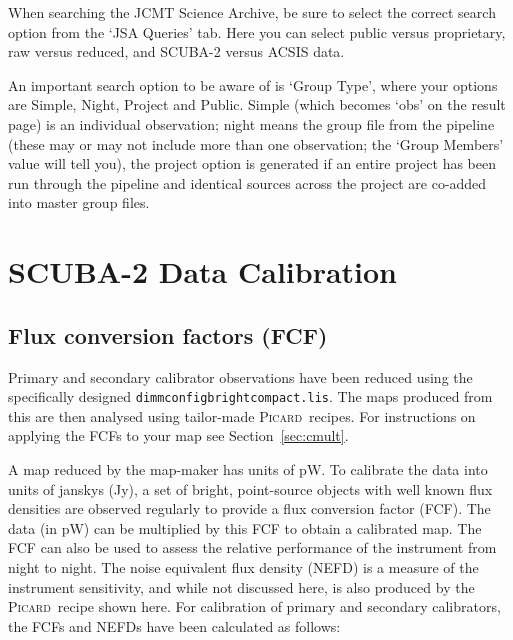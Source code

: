\documentclass[twoside,11pt]{article}
\newcommand{\xref}[3]{#1}
\newcommand{\xlabel}[1]{}
\renewcommand{\_}{\texttt{\symbol{95}}}
\newcommand{\picard}{\xref{\textsc{Picard}}{sun265}{}}
\begin{document}
When searching the JCMT Science Archive, be sure to select the correct
search option from the `JSA Queries' tab. Here you can select public
versus proprietary, raw versus reduced, and SCUBA-2 versus ACSIS data.

An important search option to be aware of is `Group Type', where your
options are Simple, Night, Project and Public. Simple (which becomes
`obs' on the result page) is an individual observation; night means
the group file from the pipeline (these may or may not include more
than one observation; the `Group Members' value will tell you), the
project option is generated if an entire project has been run through
the pipeline and identical sources across the project are co-added
into master group files.

\clearpage
\section{\xlabel{calib}SCUBA-2 Data Calibration}
\label{sec:cal}

\subsection{\xlabel{fcf}Flux conversion factors (FCF)}
\label{sec:fcf}

Primary and secondary calibrator observations have been reduced using
the specifically designed \texttt{dimmconfig\_bright\_compact.lis}.
The maps produced from this are then analysed using tailor-made
\picard\ recipes. For instructions on applying the FCFs to your map see
Section~\ref{sec:cmult}.

A map reduced by the map-maker has units of pW. To calibrate the data
into units of janskys (Jy), a set of bright, point-source objects with
well known flux densities are observed regularly to provide a flux
conversion factor (FCF). The data (in pW) can be multiplied by this FCF
to obtain a calibrated map. The FCF can also be used to assess the
relative performance of the instrument from night to night. The noise
equivalent flux density (NEFD) is a measure of the instrument
sensitivity, and while not discussed here, is also produced by the
\picard\ recipe shown here. For calibration of primary and secondary
calibrators, the FCFs and NEFDs have been calculated as follows:
\end{document}
